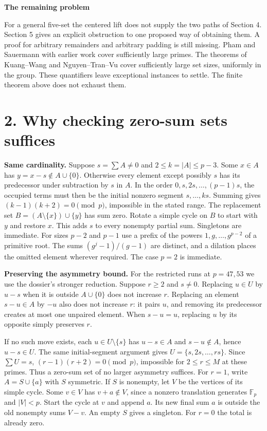 \documentclass[11pt]{article}
\newcommand{\F}{\mathbb F}
\newcommand{\sect}[1]{\section*{\color{ink}#1}}
\newcommand{\subh}[1]{\par\smallskip\textbf{#1}\par\nobreak}
\begin{document}
\subh{The remaining problem}
For a general five-set the centered lift does not supply the two paths of Section 4. Section 5 gives an explicit obstruction to one proposed way of obtaining them. A proof for arbitrary remainders and arbitrary padding is still missing. Pham and Sauermann with earlier work cover sufficiently large primes. The theorems of Kuang--Wang and Nguyen--Tran--Vu cover sufficiently large set sizes, uniformly in the group. These quantifiers leave exceptional instances to settle. The finite theorem above does not exhaust them.
\newpage
\sect{2. Why checking zero-sum sets suffices}
\textbf{Same cardinality.} Suppose $s=\sum A\ne0$ and $2\le k=|A|\le p-3$. Some $x\in A$ has $y=x-s\notin A\cup\{0\}$. Otherwise every element except possibly $s$ has its predecessor under subtraction by $s$ in $A$. In the order $0,s,2s,\dots,(p-1)s$, the occupied terms must then be the initial nonzero segment $s,\dots,ks$. Summing gives $(k-1)(k+2)=0\pmod p$, impossible in the stated range. The replacement set $B=(A\setminus\{x\})\cup\{y\}$ has sum zero. Rotate a simple cycle on $B$ to start with $y$ and restore $x$. This adds $s$ to every nonempty partial sum. Singletons are immediate. For sizes $p-2$ and $p-1$ use a prefix of the powers $1,g,\ldots,g^{p-2}$ of a primitive root. The sums $(g^j-1)/(g-1)$ are distinct, and a dilation places the omitted element wherever required. The case $p=2$ is immediate.

\textbf{Preserving the asymmetry bound.} For the restricted runs at $p=47,53$ we use the dossier's stronger reduction. Suppose $r\ge2$ and $s\ne0$. Replacing $u\in U$ by $u-s$ when it is outside $A\cup\{0\}$ does not increase $r$. Replacing an element $s-u\in A$ by $-u$ also does not increase $r$: it pairs $u$, and removing its predecessor creates at most one unpaired element. When $s-u=u$, replacing $u$ by its opposite simply preserves $r$.

If no such move exists, each $u\in U\setminus\{s\}$ has $u-s\in A$ and $s-u\notin A$, hence $u-s\in U$. The same initial-segment argument gives $U=\{s,2s,\ldots,rs\}$. Since $\sum U=s$, $(r-1)(r+2)=0\pmod p$, impossible for $2\le r\le M$ at these primes. Thus a zero-sum set of no larger asymmetry suffices. For $r=1$, write $A=S\cup\{a\}$ with $S$ symmetric. If $S$ is nonempty, let $V$ be the vertices of its simple cycle. Some $v\in V$ has $v+a\notin V$, since a nonzero translation generates $\F_p$ and $|V|<p$. Start the cycle at $v$ and append $a$. Its new final sum $a$ is outside the old nonempty sums $V-v$. An empty $S$ gives a singleton. For $r=0$ the total is already zero.
\end{document}
